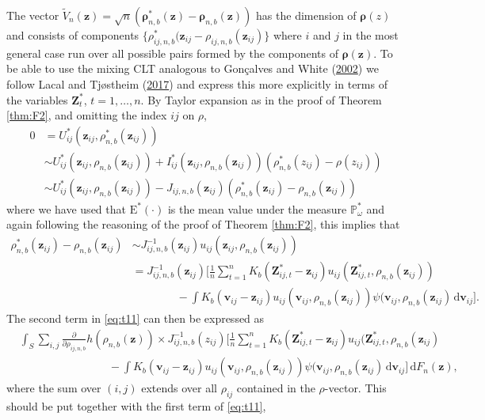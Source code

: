 \documentclass[
  12pt,
  letterpaper]{article}
\numberwithin{equation}{section}
\newcommand{\Z}{\bm{Z}}
\newcommand{\z}{\bm{z}}
\newcommand{\fv}{\bm{v}}
\newcommand{\frho}{\bm{\rho}}
\newcommand{\E}{\textrm{E}}
\newcommand{\di}{\,\textrm{d}}
\begin{document}
The vector \(\tilde{V}_n(\z) = \sqrt{n}\left(\frho_{n,b}^*(\z)-\frho_{n,b}(\z)\right)\) has the dimension of \(\frho(z)\) and consists of components \(\{\rho_{ij,n,b}^*(\z_{ij}-\rho_{ij,n,b}(\z_{ij})\}\) where \(i\) and \(j\) in the most general case run over all possible pairs formed by the components of \(\frho(\z)\). To be able to use the mixing CLT analogous to Gonçalves and White (\protect\hyperlink{ref-gonccalves2002bootstrap}{2002}) we follow Lacal and Tjøstheim (\protect\hyperlink{ref-lacal2017local}{2017}) and express this more explicitly in terms of the variables \(\Z^{*}_t\), \(t=1,\ldots,n\). By Taylor expansion as in the proof of Theorem \ref{thm:F2}, and omitting the index \(ij\) on \(\rho\),
\begin{align*}
0 &= U_{ij}^*(\z_{ij},\rho_{n,b}^*(\z_{ij})) \\
& \sim U_{ij}^*(\z_{ij},\rho_{n,b}(\z_{ij}))+I_{ij}^*(\z_{ij},\rho_{n,b}(\z_{ij}))(\rho_{n,b}^*(z_{ij})-\rho(z_{ij})) \\
& \sim U_{ij}^*(\z_{ij},\rho_{n,b}(\z_{ij})) - J_{ij,n,b}(\z_{ij})(\rho_{n,b}^*(\z_{ij})-\rho_{n,b}(\z_{ij}))
\end{align*}
where we have used that \(\E^*(\cdot)\) is the mean value under the measure \(\mathbb{P}_{\omega}^{*}\) and again following the reasoning of the proof of Theorem \ref{thm:F2}, this
implies that
\begin{align}
\rho_{n,b}^*(\z_{ij}) - \rho_{n,b}(\z_{ij}) &\sim J_{ij,n,b}^{-1}(\z_{ij})u_{ij}(\z_{ij},\rho_{n,b}(\z_{ij})) \nonumber \\
& = J_{ij,n,b}^{-1}(\z_{ij})\Big[\frac{1}{n}\sum_{t=1}^{n} K_b(\Z_{ij,t}^{*} - \z_{ij})u_{ij}(\Z_{ij,t}^{*},\rho_{n,b}(\z_{ij})) \nonumber \\
 & \qquad\qquad - \int K_b(\fv_{ij} - \z_{ij})u_{ij}(\fv_{ij},\rho_{n,b}(\z_{ij}))\psi(\fv_{ij},\rho_{n,b}(\z_{ij}) \di \fv_{ij}\big].
\end{align}
The second term in \eqref{eq:t11} can then be expressed as
\begin{align}
&\int_S \sum_{i,j} \frac{\partial}{\partial \rho_{ij,n,b}} h(\rho_{n,b}(\z)) \times
 J_{ij,n,b}^{-1}(z_{ij})
\Big[\frac{1}{n}\sum_{t=1}^{n} K_b(\Z_{ij,t}^{*}-\z_{ij})u_{ij}(\Z_{ij,t}^{*},\rho_{n,b}(\z_{ij})  \nonumber \\
& \qquad\qquad\qquad\qquad - \int K_b(\fv_{ij} - \z_{ij})u_{ij}(\fv_{ij},\rho_{n,b}(\z_{ij}))\psi(\fv_{ij},\rho_{n,b}(\z_{ij}) \di \fv_{ij}\Big] \di F_n(\z),
\label{eq:t22}
\end{align}
where the sum over \((i,j)\) extends over all \(\rho_{ij}\) contained in the \(\rho\)-vector. This should be put together with the first term of \eqref{eq:t11},
\end{document}
